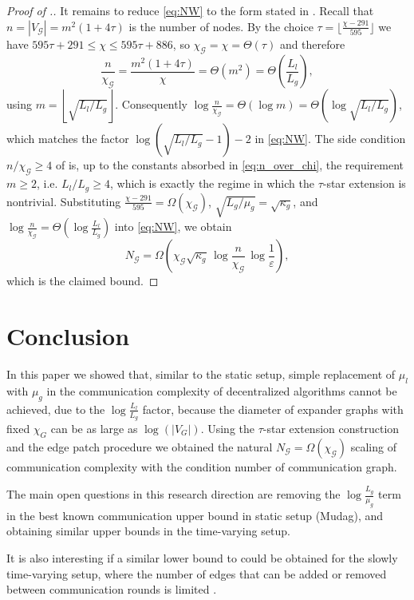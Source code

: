 \documentclass[a4paper,USenglish,cleveref, autoref, thm-restate]{lipics-v2021}
\newcommand{\eps}{\varepsilon}
\newcommand{\cG}{{\mathcal G}}
\newcommand{\floor}[1]{\left\lfloor{#1}\right\rfloor}
\newcommand{\cbr}[1]{\left(#1\right)}
\begin{document}
\begin{proof}[Proof of .]
It remains to reduce \eqref{eq:NW} to the form stated in .
Recall that $n = |V_\cG| = m^2(1 + 4\tau)$ is the number of nodes. By the choice $\tau = \lfloor\frac{\chi-291}{595}\rfloor$ we have $595\tau + 291 \leq \chi \leq 595\tau + 886$, so $\chi_\cG = \chi = \Theta(\tau)$ and therefore
\begin{equation}\label{eq:n_over_chi}
  \frac{n}{\chi_\cG} = \frac{m^2(1 + 4\tau)}{\chi} = \Theta(m^2) = \Theta\cbr{\frac{L_l}{L_g}},
\end{equation}
using $m = \floor{\sqrt{L_l/L_g}}$. Consequently $\log\frac{n}{\chi_\cG} = \Theta(\log m) = \Theta\cbr{\log\sqrt{L_l/L_g}}$, which matches the factor $\log(\sqrt{L_l/L_g} - 1) - 2$ in \eqref{eq:NW}. The side condition $n/\chi_\cG \geq 4$ of  is, up to the constants absorbed in \eqref{eq:n_over_chi}, the requirement $m \geq 2$, i.e. $L_l/L_g \geq 4$, which is exactly the regime in which the $\tau$-star extension is nontrivial.
Substituting $\frac{\chi - 291}{595} = \Omega(\chi_\cG)$, $\sqrt{L_g/\mu_g} = \sqrt{\kappa_g}$, and $\log\frac{n}{\chi_\cG} = \Theta\cbr{\log\frac{L_l}{L_g}}$ into \eqref{eq:NW}, we obtain
\begin{equation}
  N_\cG = \Omega\cbr{\chi_\cG \sqrt{\kappa_g}\,\log\frac{n}{\chi_\cG}\,\log\frac1\eps},
\end{equation}
which is the claimed bound.
\end{proof}

\section{Conclusion}
In this paper we showed that, similar to the static setup, simple replacement of $\mu_l$ with $\mu_g$ in the communication complexity of decentralized algorithms cannot be achieved, due to the $\log\frac{L_l}{L_g}$ factor, because the diameter of expander graphs with fixed $\chi_G$ can be as large as $\log(|V_G|)$.
Using the $\tau$-star extension construction and the edge patch procedure we obtained the natural $N_\cG = \Omega(\chi_\cG)$ scaling of communication complexity with the condition number of communication graph.

The main open questions in this research direction are removing the $\log \frac{L_g}{\mu_g}$ term in the best known communication upper bound in static setup (Mudag), and obtaining similar upper bounds in the time-varying setup.

It is also interesting if a similar lower bound to  could be obtained for the slowly time-varying setup, where the number of edges that can be added or removed between communication rounds is limited \cite{metelev2023consensus, metelev2023decentralized}.




\end{document}
